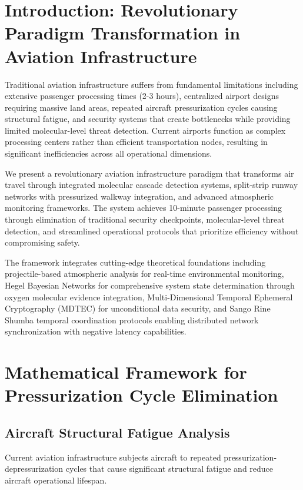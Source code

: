 \documentclass[12pt,a4paper]{article}
\begin{document}
\tableofcontents

\section{Introduction: Revolutionary Paradigm Transformation in Aviation Infrastructure}

Traditional aviation infrastructure suffers from fundamental limitations including extensive passenger processing times (2-3 hours), centralized airport designs requiring massive land areas, repeated aircraft pressurization cycles causing structural fatigue, and security systems that create bottlenecks while providing limited molecular-level threat detection. Current airports function as complex processing centers rather than efficient transportation nodes, resulting in significant inefficiencies across all operational dimensions.

We present a revolutionary aviation infrastructure paradigm that transforms air travel through integrated molecular cascade detection systems, split-strip runway networks with pressurized walkway integration, and advanced atmospheric monitoring frameworks. The system achieves 10-minute passenger processing through elimination of traditional security checkpoints, molecular-level threat detection, and streamlined operational protocols that prioritize efficiency without compromising safety.

The framework integrates cutting-edge theoretical foundations including projectile-based atmospheric analysis for real-time environmental monitoring, Hegel Bayesian Networks for comprehensive system state determination through oxygen molecular evidence integration, Multi-Dimensional Temporal Ephemeral Cryptography (MDTEC) for unconditional data security, and Sango Rine Shumba temporal coordination protocols enabling distributed network synchronization with negative latency capabilities.

\section{Mathematical Framework for Pressurization Cycle Elimination}

\subsection{Aircraft Structural Fatigue Analysis}

Current aviation infrastructure subjects aircraft to repeated pressurization-depressurization cycles that cause significant structural fatigue and reduce aircraft operational lifespan.
\end{document}
